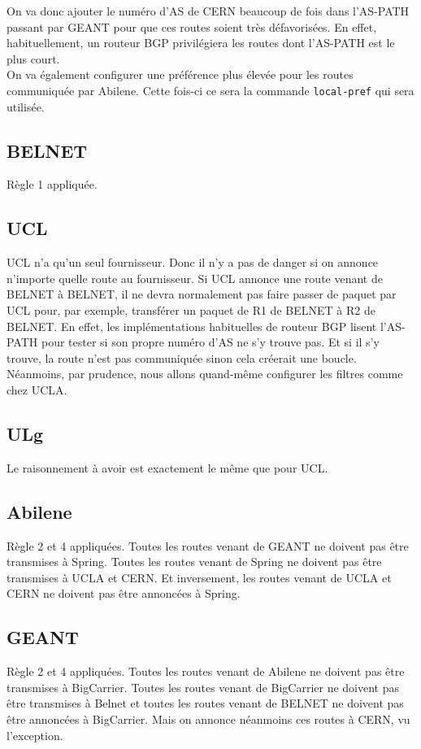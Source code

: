 \documentclass[a4paper, 12pt]{article}
\begin{document}
On va donc ajouter le numéro d'AS de CERN beaucoup de fois dans l'AS-PATH passant par GEANT pour que ces routes soient très défavorisées.
En effet, habituellement, un routeur BGP privilégiera les routes dont l'AS-PATH est le plus court. 
\\

On va également configurer une préférence plus élevée pour les routes communiquée par Abilene.
Cette fois-ci ce sera la commande \texttt{local-pref} qui sera utilisée.

\subsection{BELNET}
Règle 1 appliquée.

\subsection{UCL}
UCL n'a qu'un seul fournisseur. Donc il n'y a pas de danger si on annonce n'importe quelle route au fournisseur.
Si UCL annonce une route venant de BELNET à BELNET, il ne devra normalement pas faire passer de paquet par UCL pour, par exemple, transférer un paquet de R1 de BELNET à R2 de BELNET.
En effet, les implémentations habituelles de routeur BGP lisent l'AS-PATH pour tester si son propre numéro d'AS ne s'y trouve pas.
Et si il s'y trouve, la route n'est pas communiquée sinon cela créerait une boucle.
Néanmoins, par prudence, nous allons quand-même configurer les filtres comme chez UCLA.

\subsection{ULg}
Le raisonnement à avoir est exactement le même que pour UCL.

\subsection{Abilene}
Règle 2 et 4 appliquées. Toutes les routes venant de GEANT ne doivent pas être transmises à Spring.
Toutes les routes venant de Spring ne doivent pas être transmises à UCLA et CERN.
Et inversement, les routes venant de UCLA et CERN ne doivent pas être annoncées à Spring.

\subsection{GEANT}
Règle 2 et 4 appliquées. Toutes les routes venant de Abilene ne doivent pas être transmises à BigCarrier.
Toutes les routes venant de BigCarrier ne doivent pas être transmises à Belnet et toutes les routes venant de BELNET ne doivent pas être annoncées à BigCarrier.
Mais on annonce néanmoins ces routes à CERN, vu l'exception.
\end{document}
